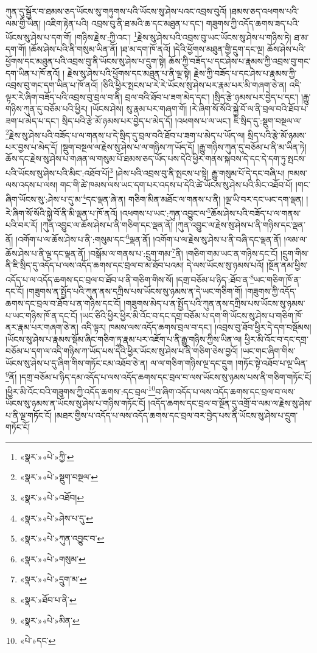 ཀུན་དུ་སྦྱོར་བ་ཐམས་ཅད་ཡོངས་སུ་གཏུགས་པའི་ཡོངས་སུ་ཤེས་པའང་འབྲས་བུའོ། །ཐམས་ཅད་འཕགས་པའི་ལམ་གྱི་ཡིན། །འཇིག་རྟེན་པའི། འབྲས་བུ་ནི་ཐ་མའི་ཆ་དང་མཐུན་པ་དང་། གཟུགས་ཀྱི་འདོད་ཆགས་ཟད་པའི་ཡོངས་སུ་ཤེས་པ་དག་གོ། །གཉིས་རྗེས་:ཀྱི་འང་། \footnote{«སྣར་»«པེ་»ཀྱི་}རྗེས་སུ་ཤེས་པའི་འབྲས་བུ་ཡང་ཡོངས་སུ་ཤེས་པ་གཉིས་ཏེ། ཐ་མ་དག་གོ། །ཆོས་ཤེས་པའི་ནི་གསུམ་ཡིན་ནོ། །ཐ་མ་དག་ཁོ་ནའོ། །དེའི་ཕྱོགས་མཐུན་གྱི་དྲུག་དང་ལྔ། ཆོས་ཤེས་པའི་ཕྱོགས་དང་མཐུན་པའི་འབྲས་བུ་ནི་ཡོངས་སུ་ཤེས་པ་དྲུག་སྟེ། ཆོས་ཀྱི་བཟོད་པ་དང་ཤེས་པ་རྣམས་ཀྱི་འབྲས་བུ་གང་དག་ཡིན་པ་ཁོ་ནའོ། །
རྗེས་སུ་ཤེས་པའི་ཕྱོགས་དང་མཐུན་པ་ནི་ལྔ་སྟེ། རྗེས་ཀྱི་བཟོད་པ་དང་ཤེས་པ་རྣམས་ཀྱི་འབྲས་བུ་གང་དག་ཡིན་པ་ཁོ་ནའོ། །ཅིའི་ཕྱིར་སྤངས་པ་རེ་རེ་ཡོངས་སུ་ཤེས་པར་རྣམ་པར་མི་གཞག་ཅེ་ན། འདི་ལྟར་རེ་ཞིག་བཟོད་པའི་འབྲས་བུ་བྲལ་བ་ནི། བྲལ་བའི་ཐོབ་པ་ཟག་མེད་དང་། །སྲིད་རྩེ་ཉམས་པར་བྱེད་པ་དང་། །རྒྱུ་གཉིས་ཀུན་དུ་བཅོམ་པའི་ཕྱིར། །ཡོངས་ཤེས། སུ་རྣམ་པར་གཞག་གོ། །རེ་ཞིག་སོ་སོའི་སྐྱེ་བོ་ལ་ནི་བྲལ་བའི་ཐོབ་པ་ཟག་པ་མེད་པ་དང་། སྲིད་པའི་རྩེ་མོ་ཉམས་པར་བྱེད་པ་མེད་དོ། །འཕགས་པ་ལ་ཡང་། ཇི་སྲིད་དུ་:སྡུག་བསྔལ་ལ་\footnote{«སྣར་»«པེ་»སྡུག་བསྔལ་}རྗེས་སུ་ཤེས་པའི་བཟོད་པ་ལ་གནས་པ་དེ་སྲིད་དུ་བྲལ་བའི་ཐོབ་པ་ཟག་པ་མེད་པ་ཡོད་ལ། སྲིད་པའི་རྩེ་མོ་ཉམས་པར་བྱས་པ་མེད་དོ། །སྡུག་བསྔལ་ལ་རྗེས་སུ་ཤེས་པ་ལ་གཉིས་ཀ་ཡོད་དོ། །རྒྱུ་གཉིས་ཀུན་དུ་བཅོམ་པ་ནི་མ་ཡིན་ཏེ། ཆོས་དང་རྗེས་སུ་ཤེས་པ་གཞན་ལ་གསུམ་པོ་ཐམས་ཅད་ཡོད་པས་དེའི་ཕྱིར་གནས་སྐབས་དེ་དང་དེ་དག་ཏུ་སྤངས་པའི་ཡོངས་སུ་ཤེས་པའི་མིང་:འཐོབ་པོ།\footnote{«སྣར་»«པེ་»འཐོབ།} །ཤེས་པའི་འབྲས་བུ་ནི་སྤངས་པ་སྟེ། རྒྱུ་གསུམ་པོ་དེ་དང་བཞི་པ། ཁམས་ལས་འདས་པ་ལས། གང་གི་ཚེ་ཁམས་ལས་ཡང་དག་པར་འདས་པ་དེའི་ཚེ་ཡོངས་སུ་ཤེས་པའི་མིང་འཐོབ་པོ། །གང་ཞིག་ཡོངས་སུ་:ཤེས་པ་དུ་མ་\footnote{«སྣར་»«པེ་»ཤེས་པ་དུ་}དང་ལྡན་ཞེ་ན། གཅིག་མིན་མཐོང་ལ་གནས་པ་ནི། །ལྔ་ཡི་བར་དང་ཡང་དག་ལྡན། །རེ་ཞིག་སོ་སོའི་སྐྱེ་བོ་ནི་མི་ལྡན་པ་ཁོ་ནའོ། །འཕགས་པ་ཡང་:ཀུན་འབྱུང་ལ་\footnote{«སྣར་»«པེ་»ཀུན་འབྱུང་བ་}ཆོས་ཤེས་པའི་བཟོད་པ་ལ་གནས་པའི་བར་རོ། །ཀུན་འབྱུང་ལ་ཆོས་ཤེས་པ་ནི་གཅིག་དང་ལྡན་ནོ། །ཀུན་འབྱུང་ལ་རྗེས་སུ་ཤེས་པ་ནི་གཉིས་དང་ལྡན་ནོ། །འགོག་པ་ལ་ཆོས་ཤེས་པ་ནི་:གསུམ་དང་\footnote{«སྣར་»«པེ་»གསུམ་}ལྡན་ནོ། །འགོག་པ་ལ་རྗེས་སུ་ཤེས་པ་ནི་བཞི་དང་ལྡན་ནོ། །ལམ་ལ་ཆོས་ཤེས་པ་ནི་ལྔ་དང་ལྡན་ནོ། །བསྒོམ་ལ་གནས་པ་:དྲུག་གམ་\footnote{«སྣར་»«པེ་»དྲུག་མ་}ནི། །གཅིག་གམ་ཡང་ན་གཉིས་དང་ངོ། །དྲུག་གིས་ནི་ཇི་སྲིད་དུ་འདོད་པ་ལས་འདོད་ཆགས་དང་བྲལ་བ་མ་ཐོབ་པའམ། དེ་ལས་ཡོངས་སུ་ཉམས་པའོ། །སྔོན་ནམ་ཕྱིས་འདོད་པ་ལ་འདོད་ཆགས་དང་བྲལ་བ་ཐོབ་པ་ནི་གཅིག་གིས་སོ། །དགྲ་བཅོམ་པ་ཉིད་:ཐོབ་ན་\footnote{«སྣར་»ཐོབ་པ་ནི་}ཡང་གཅིག་ཁོ་ན་དང་ངོ། །གཟུགས་ན་སྤྱོད་པའི་ཀུན་ནས་དཀྲིས་པས་ཡོངས་སུ་ཉམས་ན་དེ་ཡང་གཅིག་གོ། །གཟུགས་ཀྱི་འདོད་ཆགས་དང་བྲལ་བ་ཐོབ་པ་ན་གཉིས་དང་ངོ། །གཟུགས་མེད་པ་ན་སྤྱོད་པའི་ཀུན་ནས་དཀྲིས་པས་ཡོངས་སུ་ཉམས་པ་ཡང་གཉིས་ཁོ་ན་དང་ངོ། །ཡང་ཅིའི་ཕྱིར་ཕྱིར་མི་འོང་བ་དང་དགྲ་བཅོམ་པ་དག་གི་ཡོངས་སུ་ཤེས་པ་གཅིག་ཁོ་ནར་རྣམ་པར་གཞག་ཅེ་ན། འདི་ལྟར། ཁམས་ལས་འདོད་ཆགས་བྲལ་བ་དང་། །འབྲས་བུ་ཐོབ་ཕྱིར་དེ་དག་བསྡོམས། །ཡོངས་སུ་ཤེས་པ་རྣམས་སྡོམ་ཞིང་གཅིག་ཏུ་རྣམ་པར་འཇོག་པ་ནི་རྒྱུ་གཉིས་ཀྱིས་ཡིན་ལ། ཕྱིར་མི་འོང་བ་དང་དགྲ་བཅོམ་པ་དག་ལ་འདི་གཉིས་ཀ་ཡོད་པས་དེའི་ཕྱིར་ཡོངས་སུ་ཤེས་པ་ནི་གཅིག་ཅེས་བྱའོ། །ཡང་གང་ཞིག་གིས་ཡོངས་སུ་ཤེས་པ་དུ་ཞིག་གིས་གཏོང་ངམ་འཐོབ་ཅེ་ན། ལ་ལ་གཅིག་གཉིས་ལྔ་དང་དྲུག །གཏོང་སྟེ་འཐོབ་པ་ལྔ་ཡིན་\footnote{«སྣར་»«པེ་»མིན་}ནོ། །དགྲ་བཅོམ་པ་ཉིད་དམ་འདོད་པ་ལས་འདོད་ཆགས་དང་བྲལ་བ་ལས་ཡོངས་སུ་ཉམས་པས་ནི་གཅིག་གཏོང་ངོ། །ཕྱིར་མི་འོང་བའི་གཟུགས་ཀྱི་འདོད་ཆགས་:དང་བྲལ་\footnote{«པེ་»དང་}བ་ཞིག་འདོད་པ་ལས་འདོད་ཆགས་དང་བྲལ་བ་ལས་ཡོངས་སུ་ཉམས་ན་ཡོངས་སུ་ཤེས་པ་གཉིས་གཏོང་ངོ། །འདོད་ཆགས་དང་བྲལ་བ་སྔོན་དུ་འགྲོ་བ་ལམ་ལ་རྗེས་སུ་ཤེས་པ་ནི་ལྔ་གཏོང་ངོ། །མཐར་གྱིས་པ་འདོད་པ་ལས་འདོད་ཆགས་དང་བྲལ་བར་བྱེད་པས་ནི་ཡོངས་སུ་ཤེས་པ་དྲུག་གཏོང་ངོ། 
